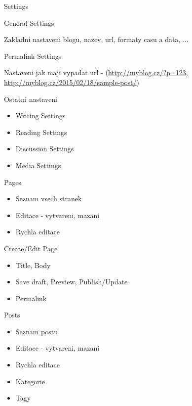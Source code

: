 \documentclass{beamer}
\begin{document}
\begin{frame}
    {Settings}

\end{frame}


\begin{frame}
    {General Settings}

    Zakladni nastaveni blogu, nazev, url, formaty casu a data, ...
\end{frame}


\begin{frame}
    {Permalink Settings}

    Nastaveni jak maji vypadat url - (\url{http://myblog.cz/?p=123}, \url{http://myblog.cz/2015/02/18/sample-post/})
\end{frame}


\begin{frame}
    {Ostatni nastaveni}

    \begin{itemize}
        \item Writing Settings
        \item Reading Settings
        \item Discussion Settings
        \item Media Settings
    \end{itemize}
\end{frame}


\begin{frame}
    {Pages}

    \begin{itemize}
        \item Seznam vsech stranek
        \item Editace - vytvareni, mazani
        \item Rychla editace
    \end{itemize}
\end{frame}

\begin{frame}
    {Create/Edit Page}

    \begin{itemize}
        \item Title, Body
        \item Save draft, Preview, Publish/Update
        \item Permalink
    \end{itemize}
\end{frame}


\begin{frame}
    {Posts}

    \begin{itemize}
        \item Seznam postu
        \item Editace - vytvareni, mazani
        \item Rychla editace
        \item Kategorie
        \item Tagy
    \end{itemize}
\end{frame}
\end{document}
